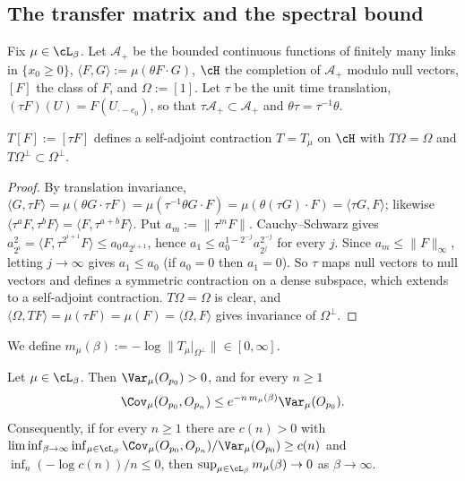 \subsection{The transfer matrix and the spectral bound}\label{pf:sec-transfer}

Fix $\mu\in\cL_\beta$. Let $\mathcal A_+$ be the bounded continuous functions of finitely many links in $\{x_0\ge0\}$, $\langle F,G\rangle:=\mu(\theta F\cdot G)$, $\cH$ the completion of $\mathcal A_+$ modulo null vectors, $[F]$ the class of $F$, and $\Omega:=[1]$. Let $\tau$ be the unit time translation, $(\tau F)(U)=F(U_{\cdot-e_0})$, so that $\tau\mathcal A_+\subset\mathcal A_+$ and $\theta\tau=\tau^{-1}\theta$.

\begin{lemma}\label{pf:lem-transfer}
$T[F]:=[\tau F]$ defines a self-adjoint contraction $T=T_\mu$ on $\cH$ with $T\Omega=\Omega$ and $T\Omega^\perp\subset\Omega^\perp$.
\end{lemma}

\begin{proof}
By translation invariance, $\langle G,\tau F\rangle=\mu(\theta G\cdot\tau F)=\mu(\tau^{-1}\theta G\cdot F)=\mu(\theta(\tau G)\cdot F)=\langle\tau G,F\rangle$; likewise $\langle\tau^aF,\tau^bF\rangle=\langle F,\tau^{a+b}F\rangle$. Put $a_m:=\|\tau^mF\|$. Cauchy--Schwarz gives $a_{2^i}^2=\langle F,\tau^{2^{i+1}}F\rangle\le a_0a_{2^{i+1}}$, hence $a_1\le a_0^{1-2^{-j}}a_{2^j}^{2^{-j}}$ for every $j$. Since $a_m\le\|F\|_\infty$, letting $j\to\infty$ gives $a_1\le a_0$ (if $a_0=0$ then $a_1=0$). So $\tau$ maps null vectors to null vectors and defines a symmetric contraction on a dense subspace, which extends to a self-adjoint contraction. $T\Omega=\Omega$ is clear, and $\langle\Omega,TF\rangle=\mu(\tau F)=\mu(F)=\langle\Omega,F\rangle$ gives invariance of $\Omega^\perp$.
\end{proof}

We define $m_\mu(\beta):=-\log\|T_\mu|_{\Omega^\perp}\|\in[0,\infty]$.

\begin{proposition}\label{pf:prop-spectral}
Let $\mu\in\cL_\beta$. Then $\Var_\mu(O_{p_0})>0$, and for every $n\ge1$
\begin{equation}\label{pf:eq-S1}
\Cov_\mu(O_{p_0},O_{p_n})\le e^{-n\,m_\mu(\beta)}\Var_\mu(O_{p_0}).
\end{equation}
Consequently, if for every $n\ge1$ there are $c(n)>0$ with
$\liminf_{\beta\to\infty}\inf_{\mu\in\cL_\beta}\Cov_\mu(O_{p_0},O_{p_n})/\Var_\mu(O_{p_0})\ge c(n)$ and $\inf_n(-\log c(n))/n\le0$, then $\sup_{\mu\in\cL_\beta}m_\mu(\beta)\to0$ as $\beta\to\infty$.
\end{proposition}


